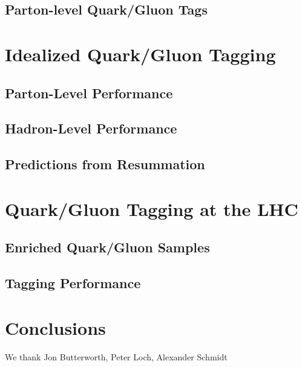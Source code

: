 \documentclass[11pt,letterpaper]{article}
\begin{document}
\subsection{Parton-level Quark/Gluon Tags}

\section{Idealized Quark/Gluon Tagging}

\subsection{Parton-Level Performance}

\subsection{Hadron-Level Performance}

\subsection{Predictions from Resummation}

\section{Quark/Gluon Tagging at the LHC}

\subsection{Enriched Quark/Gluon Samples}

\subsection{Tagging Performance}


\section{Conclusions}




\begin{acknowledgments}
We thank Jon Butterworth, Peter Loch, Alexander Schmidt

\end{acknowledgments}




\end{document}
